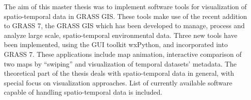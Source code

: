 \begin{mtabstract}
The aim of this master thesis was to implement software tools for visualization
of spatio-temporal data in GRASS GIS. These tools make use of the recent addition
to GRASS 7, the GRASS GIS \tf which has been developed to manage, process and analyze
large scale, spatio-temporal environmental data.
Three new tools have been implemented, using the GUI toolkit wxPython, and incorporated into GRASS 7.
These applications include map animation, interactive comparison of two maps by ``swiping''
and visualization of temporal datasets' metadata.
The theoretical part of the thesis deals with spatio-temporal data in general, with special
focus on visualization approaches. List of currently available software
capable of handling spatio-temporal data is included.





\bigskip
\bigskip
\bigskip
\bigskip


\end{mtabstract}
